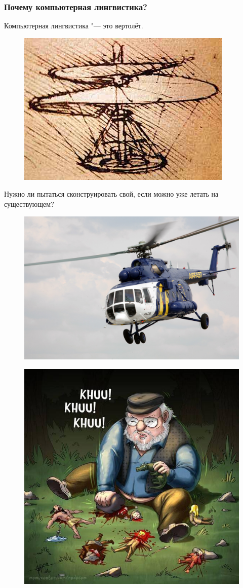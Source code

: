 \documentclass{beamer}
\begin{document}
\begin{frame}
\frametitle{Почему компьютерная лингвистика?}

Компьютерная лингвистика "--- это вертолёт. 

\begin{figure}
\includegraphics[width=0.3\linewidth]{helicopter}
\end{figure}

Нужно ли пытаться сконструировать свой, если можно уже летать на существующем?

\begin{figure}
\includegraphics[width=0.3\linewidth]{heli2}
\end{figure}

\end{frame}


\begin{frame}
\begin{figure}
\includegraphics[width=0.7\linewidth]{grrm-beetles-}
\end{figure}
\end{frame}
\end{document}
